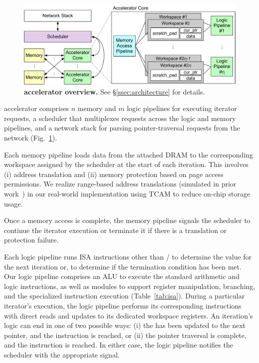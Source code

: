 \begin{figure}[t]
\centering
  \includegraphics[width=\columnwidth]{fig/pulse/accelerator.pdf}
  \vspace{-2em}
 \caption{\textbf{\name accelerator overview.} See \S\ref{ssec:architecture} for details.}
\label{fig:accelnew}
\end{figure}

 \name accelerator comprises $n$ memory and $m$ logic pipelines for executing iterator requests, a scheduler that multiplexes requests across the logic and memory pipelines, and a network stack for parsing pointer-traversal requests from the network (Fig.~\ref{fig:accelnew}).

 Each memory pipeline loads data from the attached DRAM 
to the corresponding workspace assigned by the scheduler at the start of each iteration. This involves (i) address translation and (ii) memory protection based on page access permissions. We realize range-based address translations (simulated in prior work~\cite{range}) in our real-world implementation using TCAM to reduce on-chip storage usage. 

Once a memory access is complete, the memory pipeline signals the scheduler to continue the iterator execution or terminate it if there is a translation or protection failure.


 Each logic pipeline runs \name ISA instructions other than / to determine the  value for the next iteration or, to determine if the termination condition has been met. Our logic pipeline comprises an ALU to execute the standard arithmetic and logic instructions, as well as modules to support register manipulation, branching, and the specialized  instruction execution (Table~\ref{tab:isa}). During a particular iterator's execution, the logic pipeline performs its corresponding instructions with direct reads and updates to its dedicated workspace registers. An iteration's logic can end in one of two possible ways: (i) the  has been updated to the next pointer, and the  instruction is reached, or (ii) the pointer traversal is complete, and the  instruction is reached. In either case, the logic pipeline notifies the scheduler with the appropriate signal.

